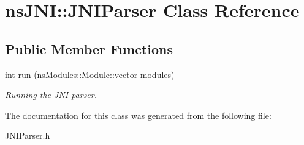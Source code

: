 \hypertarget{classnsJNI_1_1JNIParser}{\section{ns\-J\-N\-I\-:\-:\-J\-N\-I\-Parser \-Class \-Reference}
\label{classnsJNI_1_1JNIParser}
}
\subsection*{\-Public \-Member \-Functions}
\begin{DoxyCompactItemize}
\item 
int \hyperlink{group__JNI__parser_ga8a77b08d83bba9bef37ae9e7c5c63698}{run} (ns\-Modules\-::\-Module\-::vector modules)
\begin{DoxyCompactList}\small\item\em \-Running the \-J\-N\-I parser. \end{DoxyCompactList}\end{DoxyCompactItemize}


\-The documentation for this class was generated from the following file\-:\begin{DoxyCompactItemize}
\item 
\hyperlink{JNIParser_8h}{\-J\-N\-I\-Parser.\-h}\end{DoxyCompactItemize}
